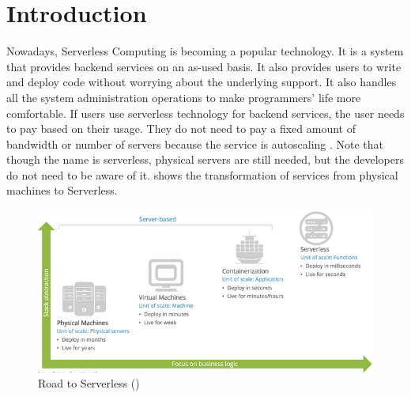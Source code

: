 \section*{Introduction}
\label{sec:introduction}

Nowadays, Serverless Computing is becoming a popular technology.  It is a system that provides backend services on an as-used basis.
It also provides users to write and deploy code without worrying about the underlying support. It also handles all the system administration operations to make programmers' life more comfortable. If users use serverless technology for backend services, the user needs to pay based on their usage. They do not need to pay a fixed amount of bandwidth or number of servers because the service is autoscaling \cite{shafiei2019serverless,wu2020}. Note that though the name is serverless, physical servers are still needed, but the developers do not need to be aware of it.  shows the transformation of services from physical machines to Serverless.

\begin{figure}[!ht]
	\centering
	\includegraphics[width=1.0\textwidth]{images/serverless.png}
	\caption{Road to Serverless ()}
	\centering
	\label{fig:serverless}
\end{figure}





